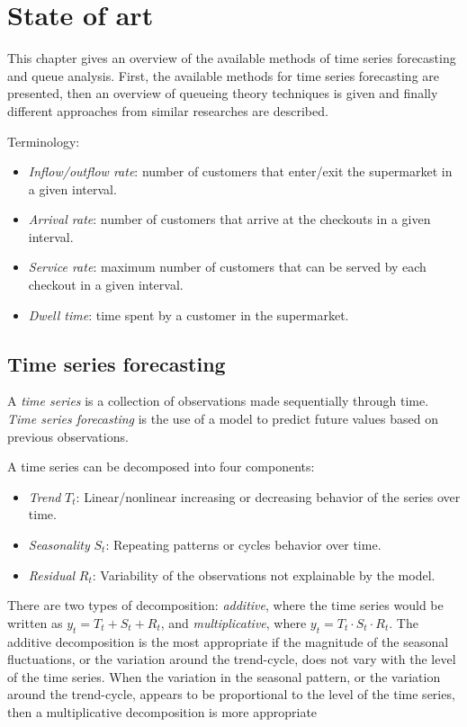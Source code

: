 \chapter{State of art}
\label{cha:state_of_art}

This chapter gives an overview of the available methods of time series forecasting and queue analysis. First, the available methods for time series forecasting are presented, then an overview of queueing theory techniques is given and finally different approaches from similar researches are described.

Terminology:
\begin{itemize}
  \item \emph{Inflow/outflow rate}: number of customers that enter/exit the supermarket in a given interval.
  \item \emph{Arrival rate}: number of customers that arrive at the checkouts in a given interval.
  \item \emph{Service rate}: maximum number of customers that can be served by each checkout in a given interval.
  \item \emph{Dwell time}: time spent by a customer in the supermarket.
\end{itemize}


\section{Time series forecasting}
\label{sec:time_series_forecasting}

A \emph{time series} is a collection of observations made sequentially through time. \emph{Time series forecasting} is the use of a model to predict future values based on previous observations.

A time series can be decomposed into four components:
\begin{itemize}
  \item \emph{Trend} \( T_t \): Linear/nonlinear increasing or decreasing behavior of the series over time.
  \item \emph{Seasonality} \( S_t \): Repeating patterns or cycles behavior over time.
  \item \emph{Residual} \( R_t \): Variability of the observations not explainable by the model.
\end{itemize}

There are two types of decomposition: \emph{additive}, where the time series would be written as \( y_t = T_t + S_t + R_t \), and \emph{multiplicative}, where \( y_t = T_t \cdot S_t \cdot R_t \).
The additive decomposition is the most appropriate if the magnitude of the seasonal fluctuations, or the variation around the trend-cycle, does not vary with the level of the time series. When the variation in the seasonal pattern, or the variation around the trend-cycle, appears to be proportional to the level of the time series, then a multiplicative decomposition is more appropriate

